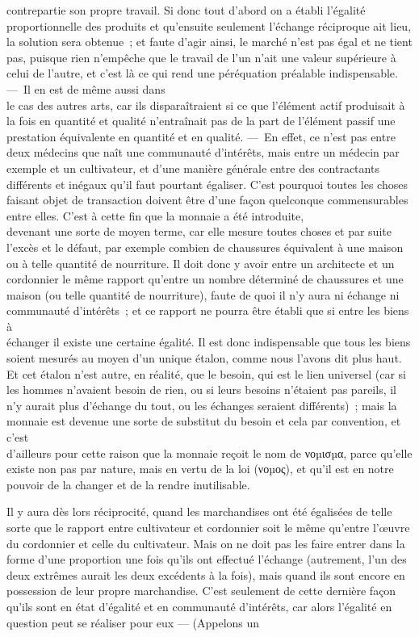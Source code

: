 \documentclass[french,twoside]{book} %
\begin{document}
contrepartie son propre travail. Si donc tout d’abord on a établi l’égalité proportionnelle des produits et qu’ensuite seulement l’échange réciproque ait lieu, la solution sera obtenue ; et faute d’agir ainsi, le marché n’est pas égal et ne tient pas, puisque rien n’empêche que le travail de l’un n’ait une valeur supérieure à celui de l’autre, et c’est là ce qui rend une péréquation préalable indispensable. — Il en est de même aussi dans \\
le cas des autres arts, car ils disparaîtraient si ce que l’élément actif produisait à la fois en quantité et qualité n’entraînait pas de la part de l’élément passif une prestation équivalente en quantité et en qualité. — En effet, ce n’est pas entre deux médecins que naît une communauté d’intérêts, mais entre un médecin par exemple et un cultivateur, et d’une manière générale entre des contractants différents et inégaux qu’il faut pourtant égaliser. C’est pourquoi toutes les choses faisant objet de transaction doivent être d’une façon quelconque commensurables entre elles. C’est à cette fin que la monnaie a été introduite, \\
devenant une sorte de moyen terme, car elle mesure toutes choses et par suite l’excès et le défaut, par exemple combien de chaussures équivalent à une maison ou à telle quantité de nourriture. Il doit donc y avoir entre un architecte et un cordonnier le même rapport qu’entre un nombre déterminé de chaussures et une maison (ou telle quantité de nourriture), faute de quoi il n’y aura ni échange ni communauté d’intérêts ; et ce rapport ne pourra être établi que si entre les biens à \\
échanger il existe une certaine égalité. Il est donc indispensable que tous les biens soient mesurés au moyen d’un unique étalon, comme nous l’avons dit plus haut. Et cet étalon n’est autre, en réalité, que le besoin, qui est le lien universel (car si les hommes n’avaient besoin de rien, ou si leurs besoins n’étaient pas pareils, il n’y aurait plus d’échange du tout, ou les échanges seraient différents) ; mais la monnaie est devenue une sorte de substitut du besoin et cela par convention, et c’est \\
d’ailleurs pour cette raison que la monnaie reçoit le nom de νοµισµα, parce qu’elle existe non pas par nature, mais en vertu de la loi (νοµος), et qu’il est en notre pouvoir de la changer et de la rendre inutilisable.\par
Il y aura dès lors réciprocité, quand les marchandises ont été égalisées de telle sorte que le rapport entre cultivateur et cordonnier soit le même qu’entre l’œuvre du cordonnier et celle du cultivateur. Mais on ne doit pas les faire entrer dans la  forme d’une proportion une fois qu’ils ont effectué l’échange (autrement, l’un des deux extrêmes aurait les deux excédents à la fois), mais quand ils sont encore en possession de leur propre marchandise. C’est seulement de cette dernière façon qu’ils sont en état d’égalité et en communauté d’intérêts, car alors l’égalité en question peut se réaliser pour eux — (Appelons un \\
\end{document}
